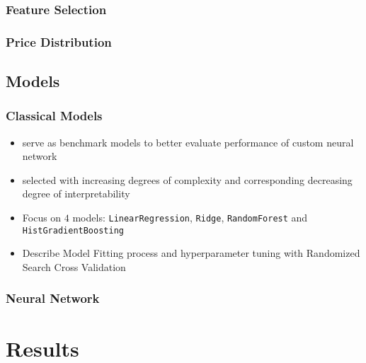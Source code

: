 \documentclass[12pt, letterpaper]{article}
\begin{document}
\subsubsection{Feature Selection} %


\subsubsection{Price Distribution} %



\subsection{Models} %

\subsubsection{Classical Models} %
\begin{itemize}
    \item serve as benchmark models to better evaluate performance of custom neural network
    \item selected with increasing degrees of complexity and corresponding decreasing degree of interpretability
    \item Focus on $4$ models: \texttt{LinearRegression}, \texttt{Ridge}, \texttt{RandomForest} and \texttt{HistGradientBoosting}
    \item Describe Model Fitting process and hyperparameter tuning with Randomized Search Cross Validation
\end{itemize}

\subsubsection{Neural Network} %



\section{Results} %

\end{document}
